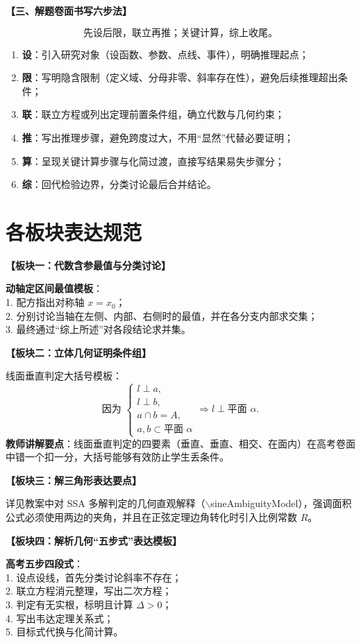 \documentclass[11pt,a4paper]{ctexart}
\newcommand{\teachblock}[2]{%
  \par\addvspace{0.55em}%
  \noindent\textbf{【#1】}\par\nobreak
  \begingroup
    \raggedright
    \setlength{\parskip}{0.35em}%
    #2\par
  \endgroup
}
\begin{document}
\teachblock{三、解题卷面书写六步法}{
  \[
    \boxed{\text{先设后限，联立再推；关键计算，综上收尾。}}
  \]
  \begin{enumerate}[label=第\arabic*步 , leftmargin=3.5em, itemsep=0.1em]
    \item \textbf{设}：引入研究对象（设函数、参数、点线、事件），明确推理起点；
    \item \textbf{限}：写明隐含限制（定义域、分母非零、斜率存在性），避免后续推理超出条件；
    \item \textbf{联}：联立方程或列出定理前置条件组，确立代数与几何约束；
    \item \textbf{推}：写出推理步骤，避免跨度过大，不用“显然”代替必要证明；
    \item \textbf{算}：呈现关键计算步骤与化简过渡，直接写结果易失步骤分；
    \item \textbf{综}：回代检验边界，分类讨论最后合并结论。
  \end{enumerate}
}

\newpage

\section{各板块表达规范}

\teachblock{板块一：代数含参最值与分类讨论}{
  \textbf{动轴定区间最值模板}：\\
  1. 配方指出对称轴 \(x = x_0\)；\\
  2. 分别讨论当轴在左侧、内部、右侧时的最值，并在各分支内部求交集；\\
  3. 最终通过“综上所述”对各段结论求并集。
}

\teachblock{板块二：立体几何证明条件组}{
  线面垂直判定大括号模板：
  \[
    \text{因为 }
    \begin{cases}
      l \perp a, \\
      l \perp b, \\
      a \cap b = A, \\
      a, b \subset \text{平面 } \alpha
    \end{cases}
    \Rightarrow l \perp \text{平面 } \alpha.
  \]
  \textbf{教师讲解要点}：线面垂直判定的四要素（垂直、垂直、相交、在面内）在高考卷面中错一个扣一分，大括号能够有效防止学生丢条件。
}

\teachblock{板块三：解三角形表达要点}{
  详见教案中对 SSA 多解判定的几何直观解释（\(\backslash\)sineAmbiguityModel），强调面积公式必须使用两边的夹角，并且在正弦定理边角转化时引入比例常数 \(R\)。
}

\teachblock{板块四：解析几何“五步式”表达模板}{
  \textbf{高考五步四段式}：\\
  1. 设点设线，首先分类讨论斜率不存在；\\
  2. 联立方程消元整理，写出二次方程；\\
  3. 判定有无实根，标明且计算 \(\Delta > 0\)；\\
  4. 写出韦达定理关系式；\\
  5. 目标式代换与化简计算。
}
\end{document}
